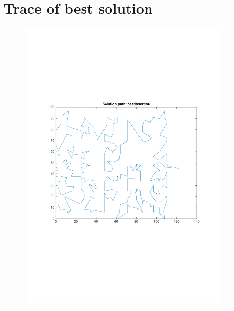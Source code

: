 \documentclass[a4paper, 11pt]{scrartcl}
\begin{document}
\section{Trace of best solution}
\label{sec:trace-best-solution}

\begin{figure}[!ht]
  \centering
  \begin{tabular}{cc}
    \includegraphics[scale=0.4, trim={3cm 6cm 1cm 6cm}]{../figures/solutionPath_bestInsertion.pdf} & 

\end{tabular}
\end{figure}
\end{document}
